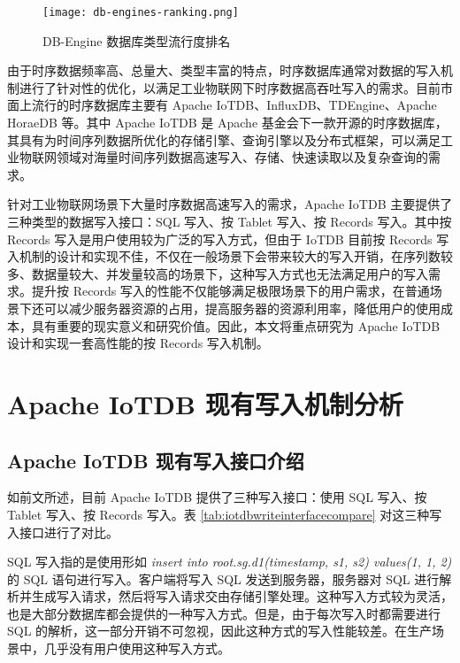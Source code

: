 \begin{figure}
  \centering
  \texttt{[image: db-engines-ranking.png]}
  \caption{DB-Engine 数据库类型流行度排名}
  \label{fig:db-engine}
\end{figure}

由于时序数据频率高、总量大、类型丰富的特点，时序数据库通常对数据的写入机制进行了针对性的优化，以满足工业物联网下时序数据高吞吐写入的需求。目前市面上流行的时序数据库主要有 Apache IoTDB\cite{wang2023apache}、InfluxDB\cite{naqvi2017time}、TDEngine\cite{tdengine2024github}、Apache HoraeDB\cite{apache2024horaedb} 等。其中 Apache IoTDB 是 Apache 基金会下一款开源的时序数据库，其具有为时间序列数据所优化的存储引擎、查询引擎以及分布式框架，可以满足工业物联网领域对海量时间序列数据高速写入、存储、快速读取以及复杂查询的需求\cite{wang2020apache}。

针对工业物联网场景下大量时序数据高速写入的需求，Apache IoTDB 主要提供了三种类型的数据写入接口：SQL 写入、按 Tablet 写入、按 Records 写入\cite{iotdb2024writedeletedata}。其中按 Records 写入是用户使用较为广泛的写入方式，但由于 IoTDB 目前按 Records 写入机制的设计和实现不佳，不仅在一般场景下会带来较大的写入开销，在序列数较多、数据量较大、并发量较高的场景下，这种写入方式也无法满足用户的写入需求。提升按 Records 写入的性能不仅能够满足极限场景下的用户需求，在普通场景下还可以减少服务器资源的占用，提高服务器的资源利用率，降低用户的使用成本，具有重要的现实意义和研究价值。因此，本文将重点研究为 Apache IoTDB 设计和实现一套高性能的按 Records 写入机制。
\section{Apache IoTDB 现有写入机制分析\label{sec:chap1-sec2}}
\subsection{Apache IoTDB 现有写入接口介绍}
如前文所述，目前 Apache IoTDB 提供了三种写入接口：使用 SQL 写入、按 Tablet 写入、按 Records 写入。表 \ref{tab:iotdbwriteinterfacecompare} 对这三种写入接口进行了对比。

SQL 写入指的是使用形如 \emph{insert into root.sg.d1(timestamp, s1, s2) values(1, 1, 2)} 的 SQL 语句进行写入。客户端将写入 SQL 发送到服务器，服务器对 SQL 进行解析并生成写入请求，然后将写入请求交由存储引擎处理。这种写入方式较为灵活，也是大部分数据库都会提供的一种写入方式。但是，由于每次写入时都需要进行 SQL 的解析，这一部分开销不可忽视，因此这种方式的写入性能较差。在生产场景中，几乎没有用户使用这种写入方式。

